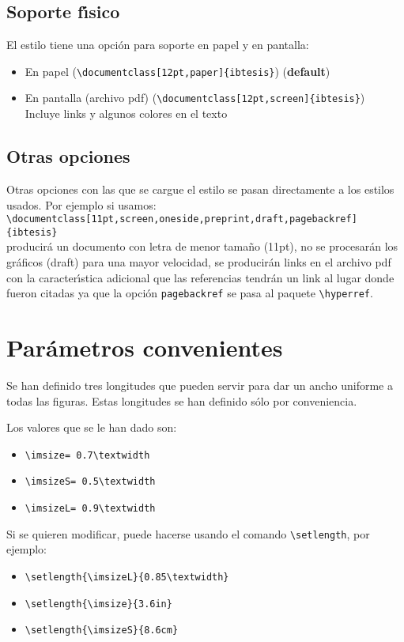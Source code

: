 \subsection*{Soporte f\'{\i}sico}

El estilo tiene una opci\'{o}n para soporte en papel y en pantalla:
\begin{itemize}
\item En papel (\verb|\documentclass[12pt,paper]{ibtesis}|) (\textbf{default})
\item En pantalla (archivo pdf) (\verb|\documentclass[12pt,screen]{ibtesis}|)\\
Incluye links y algunos colores en el texto
\end{itemize}

\subsection*{Otras opciones}
\label{S:otras-opciones}
Otras opciones con las que se cargue el estilo se pasan directamente a los estilos usados. Por ejemplo si usamos:\\
\verb|\documentclass[11pt,screen,oneside,preprint,draft,pagebackref]{ibtesis}|\\
producir\'{a} un documento con letra de menor tama\~{n}o (11pt), no se procesar\'{a}n los gr\'{a}ficos (draft) para una mayor velocidad, se producir\'{a}n links en el archivo pdf con la caracter\'{\i}stica adicional que las referencias tendr\'{a}n un link al lugar donde fueron citadas ya que la opci\'{o}n \verb|pagebackref| se pasa al paquete \verb|\hyperref|.

\section{Par\'{a}metros convenientes}
\label{S:param-conv}

Se han definido tres longitudes que pueden servir para dar un ancho uniforme a todas las figuras.
Estas longitudes se han definido s\'{o}lo por conveniencia. 

Los valores que se le han dado son:
\begin{itemize}
\item \verb|\imsize= 0.7\textwidth|
\item \verb|\imsizeS= 0.5\textwidth|
\item \verb|\imsizeL= 0.9\textwidth|
\end{itemize}

Si se quieren modificar, puede hacerse usando el comando \verb|\setlength|, por ejemplo:
\begin{itemize}
\item \verb|\setlength{\imsizeL}{0.85\textwidth}|
\item \verb|\setlength{\imsize}{3.6in}|
\item \verb|\setlength{\imsizeS}{8.6cm}|
\end{itemize}
